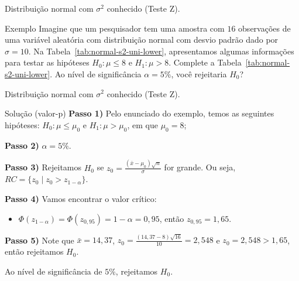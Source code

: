 \documentclass[8pt]{beamer}
\begin{document}
\begin{frame}{Distribuição normal com $\sigma^2$ conhecido (Teste Z).}

\large

 \begin{block}{Exemplo}
	Imagine que um pesquisador tem uma amostra com $16$ observações de uma variável aleatória com distribuição normal com desvio padrão dado por $\sigma=10$. Na Tabela~\ref{tab:normal-s2-uni-lower}, apresentamos algumas informações para testar as hipóteses $H_0: \mu \leq 8$ e $H_1: \mu > 8$. Complete a Tabela~\ref{tab:normal-s2-uni-lower}. Ao nível de significância $\alpha=5\%$, você rejeitaria $H_0$? 
	\begin{table}[ht]
		\centering
		\caption{Algumas informações do experimento.} 
		\label{tab:normal-s2-uni-lower}
	\end{table}
\end{block}

\normalsize

\end{frame}

\begin{frame}{Distribuição normal com $\sigma^2$ conhecido (Teste Z).}

\large
\begin{block}{Solução (valor-p)}
\textbf{Passo 1)} Pelo enunciado do exemplo, temos as seguintes hipóteses: $H_0: \mu \leq \mu_0$ e $H_1: \mu > \mu_0$, em que $\mu_0 = 8$;

\vfill

\textbf{Passo 2)} $\alpha=5\%$.
\vfill

\textbf{Passo 3)} Rejeitamos $H_0$ se $z_0 = \frac{(\bar{x} - \mu_0)\sqrt{n}}{\sigma}$ for grande. Ou seja, $RC = \{z_0 \mid z_0 > z_{1-\alpha} \}$.

\textbf{Passo 4)} Vamos encontrar o valor crítico:
\begin{itemize}
	\item $\Phi\left(z_{1-\alpha}\right) = \Phi\left(z_{0,95}\right) = 1 - \alpha =0,95$, então $z_{0,95} = 1,65$.
\end{itemize}
\vfill

\textbf{Passo 5)} Note que $\bar{x}= 14,37$,  $z_0 = \frac{(14,37 - 8)\sqrt{16}}{10} = 2,548$ e $z_0 = 2,548 > 1,65$, então rejeitamos $H_0$.
\vfill

Ao nível de significância de $5\%$, rejeitamos $H_0$.
	
\end{block}
\normalsize
\end{frame}
\end{document}
